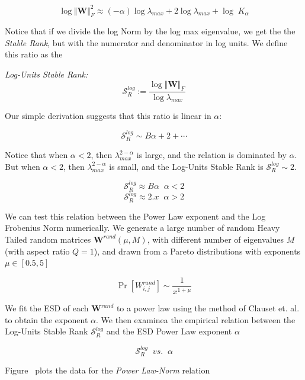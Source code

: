 $$\log\Vert\mathbf{W}\Vert^{2}_{F}\approx(-\alpha)\log\lambda_{max}+2\log\lambda_{max}+\log\;K_{\alpha}$$

Notice that if we divide the log Norm by the log max eigenvalue, we get the the \emph{Stable Rank}, but with
the numerator and denominator in log units.  We define this ratio as the

\emph{Log-Units Stable Rank:  } 
$$\mathcal{S}^{log}_{R}:=\dfrac{\log\Vert\mathbf{W}\Vert_{F}}{\log\lambda_{max}}$$

Our simple derivation suggests that this ratio is linear in $\alpha$:

$$\mathcal{S}^{log}_{R}\sim B\alpha+2+\cdots$$


Notice that when $\alpha<2$, then $\lambda_{max}^{2-\alpha}$ is large, and the relation is dominated by $\alpha$.
But when $\alpha<2$, then $\lambda_{max}^{2-\alpha}$ is small, and the Log-Units Stable Rank is $\mathcal{S}^{log}_{R}\sim 2$.

$$\mathcal{S}^{log}_{R}\approx B\alpha\;\;\alpha<2$$
$$\mathcal{S}^{log}_{R}\approx 2.x\;\;\alpha>2$$


We can test this relation between the Power Law exponent and the Log Frobenius Norm numerically.
We generate a large number of random Heavy Tailed random matrices $\mathbf{W}^{rand}(\mu,M)$, 
with different number of eigenvalues $M$ (with aspect ratio $Q=1$), 
and drawn from a Pareto distributions with exponents $\mu\in[0.5, 5]$

$$\Pr[{W}^{rand}_{i,j}]\sim\dfrac{1}{x^{1+\mu}}$$

We fit the ESD of each $\mathbf{W}^{rand}$ to a power law using the method of Clauset et. al.
to obtain the exponent $\alpha$.  We then examinea the empirical relation between  the Log-Units Stable Rank 
$\mathcal{S}^{log}_{R}$ and the ESD Power Law exponent $\alpha$

$$\mathcal{S}^{log}_{R}\;\;vs.\;\;\alpha$$



Figure~\cite{randW} plots the data for the \emph{Power Law-Norm} relation

